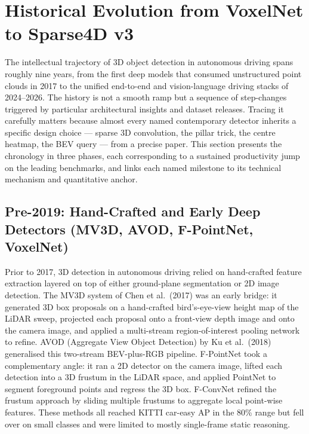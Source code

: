 \documentclass{article}
\begin{document}
\section{Historical Evolution from VoxelNet to Sparse4D v3}\label{sec:historical-evolution-from-voxelnet-to-sparse4d-v3}
The intellectual trajectory of 3D object detection in autonomous driving spans roughly nine years, from the first deep models that consumed unstructured point clouds in 2017 to the unified end-to-end and vision-language driving stacks of 2024--2026. The history is not a smooth ramp but a sequence of step-changes triggered by particular architectural insights and dataset releases. Tracing it carefully matters because almost every named contemporary detector inherits a specific design choice --- sparse 3D convolution, the pillar trick, the centre heatmap, the BEV query --- from a precise paper. This section presents the chronology in three phases, each corresponding to a sustained productivity jump on the leading benchmarks, and links each named milestone to its technical mechanism and quantitative anchor.

\subsection{Pre-2019: Hand-Crafted and Early Deep Detectors (MV3D, AVOD, F-PointNet, VoxelNet)}\label{pre-2019-hand-crafted-and-early-deep-detectors-mv3d-avod-f-pointnet-voxelnet}

Prior to 2017, 3D detection in autonomous driving relied on hand-crafted feature extraction layered on top of either ground-plane segmentation or 2D image detection. The MV3D system of Chen et al.~(2017) was an early bridge: it generated 3D box proposals on a hand-crafted bird's-eye-view height map of the LiDAR sweep, projected each proposal onto a front-view depth image and onto the camera image, and applied a multi-stream region-of-interest pooling network to refine. AVOD (Aggregate View Object Detection) by Ku et al.~(2018) generalised this two-stream BEV-plus-RGB pipeline. F-PointNet \citep{qi2017pointnetdeeplearni} took a complementary angle: it ran a 2D detector on the camera image, lifted each detection into a 3D frustum in the LiDAR space, and applied PointNet to segment foreground points and regress the 3D box. F-ConvNet \citep{wang2019dynamicgraphcnnfor} refined the frustum approach by sliding multiple frustums to aggregate local point-wise features. These methods all reached KITTI car-easy AP in the 80\% range but fell over on small classes and were limited to mostly single-frame static reasoning.
\end{document}
